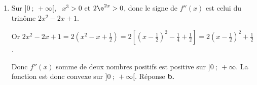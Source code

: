 \begin{enumerate}
\item  Sur $]0~;~+\infty[$, \, $x^3 > 0$ et $2\e^{2x} > 0$, donc le signe de $f''(x)$ est celui du trinôme $2x^2 - 2x +  1$.

Or $2x^2 - 2x +  1 = 2\left(x^2 - x + \frac{1}{2}\right) = 2\left[ \left (x - \frac{1}{2}\right)^2 - \frac{1}{4} + \frac{1}{2}\right ] = 2\left(x - \frac{1}{2}\right)^2 + \frac{1}{2}$. 

Donc $f''(x)$ somme de deux nombres positifs est positive sur $]0~;~+ \infty$. La fonction est donc convexe sur $]0~;~+\infty[$. \hfill{}Réponse \textbf{b.}


 
\end{enumerate}

\vspace{0,5cm}

